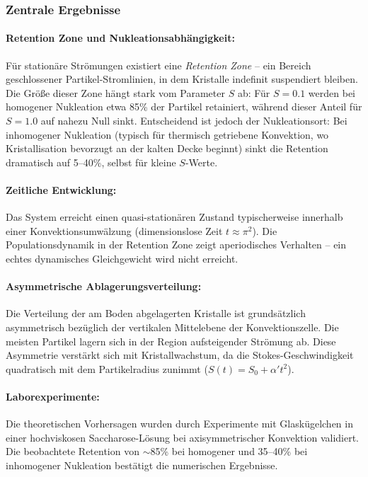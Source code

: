 \documentclass[a4paper,12pt]{article}
\begin{document}
\subsubsection*{Zentrale Ergebnisse}

\paragraph{Retention Zone und Nukleationsabhängigkeit:}
Für stationäre Strömungen existiert eine \emph{Retention Zone} -- ein Bereich geschlossener Partikel-Stromlinien, in dem Kristalle indefinit suspendiert bleiben. Die Größe dieser Zone hängt stark vom Parameter $S$ ab: Für $S = 0.1$ werden bei homogener Nukleation etwa 85\% der Partikel retainiert, während dieser Anteil für $S = 1.0$ auf nahezu Null sinkt. Entscheidend ist jedoch der Nukleationsort: Bei inhomogener Nukleation (typisch für thermisch getriebene Konvektion, wo Kristallisation bevorzugt an der kalten Decke beginnt) sinkt die Retention dramatisch auf 5--40\%, selbst für kleine $S$-Werte.

\paragraph{Zeitliche Entwicklung:}
Das System erreicht einen quasi-stationären Zustand typischerweise innerhalb einer Konvektionsumwälzung (dimensionslose Zeit $t \approx \pi^2$). Die Populationsdynamik in der Retention Zone zeigt aperiodisches Verhalten -- ein echtes dynamisches Gleichgewicht wird nicht erreicht.

\paragraph{Asymmetrische Ablagerungsverteilung:}
Die Verteilung der am Boden abgelagerten Kristalle ist grundsätzlich asymmetrisch bezüglich der vertikalen Mittelebene der Konvektionszelle. Die meisten Partikel lagern sich in der Region aufsteigender Strömung ab. Diese Asymmetrie verstärkt sich mit Kristallwachstum, da die Stokes-Geschwindigkeit quadratisch mit dem Partikelradius zunimmt ($S(t) = S_0 + \alpha' t^2$).

\paragraph{Laborexperimente:}
Die theoretischen Vorhersagen wurden durch Experimente mit Glaskügelchen in einer hochviskosen Saccharose-Lösung bei axisymmetrischer Konvektion validiert. Die beobachtete Retention von $\sim$85\% bei homogener und 35--40\% bei inhomogener Nukleation bestätigt die numerischen Ergebnisse.
\end{document}
